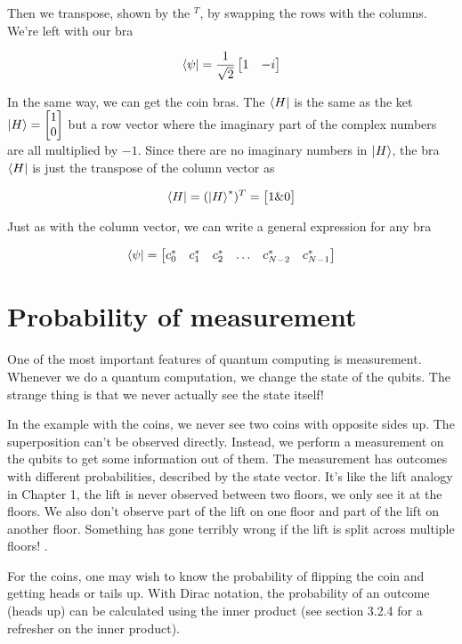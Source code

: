 \documentclass{book}
\begin{document}
Then we transpose, shown by the $^T$, by swapping the rows with the columns. We're left with our bra

$$\bra{\psi} = \frac{1}{\sqrt{2}} \begin{bmatrix} 1 & -i \end{bmatrix} $$


In the same way, we can get the coin bras. The $\bra{H}$ is the same as the ket $\ket{H} = \begin{bmatrix} 1 \\ 0 \end{bmatrix}$ but a row vector where the imaginary part of the complex numbers are all multiplied by $-1$. Since there are no imaginary numbers in $\ket{H}$, the bra $\bra{H}$ is just the transpose of the column vector as

$$
\bra{H} = (\ket{H}^*)^T = \begin{bmatrix} 1 \& 0 \end{bmatrix}
$$

Just as with the column vector, we can write a general expression for any bra

$$
\bra{\psi} = \begin{bmatrix} c_0^* & c_1^* & c_2^* & \dots & c_{N-2}^* & c_{N-1}^* \end{bmatrix}
$$

\section{ Probability of measurement}


One of the most important features of quantum computing is measurement. Whenever we do a quantum computation, we change the state of the qubits. The strange thing is that we never actually see the state itself! 

In the example with the coins, we never see two coins with opposite sides up. The superposition can't be observed directly. Instead, we perform a measurement on the qubits to get some information out of them. The measurement has outcomes with different probabilities, described by the state vector. It's like the lift analogy in Chapter 1, the lift is never observed between two floors, we only see it at the floors. We also don't observe part of the lift on one floor and part of the lift on another floor. Something has gone terribly wrong if the lift is split across multiple floors! 
. 

For the coins, one may wish to know the probability of flipping the coin and getting heads or tails up. With Dirac notation, the probability of an outcome (heads up) can be calculated using the inner product (see section 3.2.4 for a refresher on the inner product).
\end{document}
